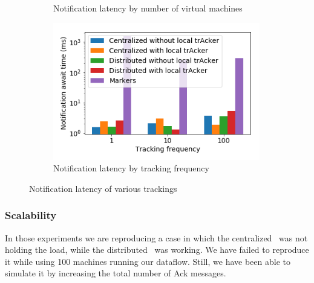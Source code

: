 \begin{figure}[t!]
\begin{subfigure}[b]{0.32\textwidth}
            \caption{Notification latency by number of virtual machines}
    \end{subfigure}
    \hspace{5mm}
    \begin{subfigure}[b]{0.32\textwidth}
            \includegraphics[width=0.99\textwidth]{pics/notification_await_time_by_tracking_frequency_bars.png}
            \caption{Notification latency by tracking frequency}
	\end{subfigure}
    \caption{Notification latency of various trackings}
\end{figure}

\subsubsection{Scalability}

In those experiments we are reproducing a case in which the centralized \tracker\ was not holding the load, while the distributed \tracker\ was working. We have failed to reproduce it while using 100 machines running our dataflow. Still, we have been able to simulate it by increasing the total number of Ack messages.

